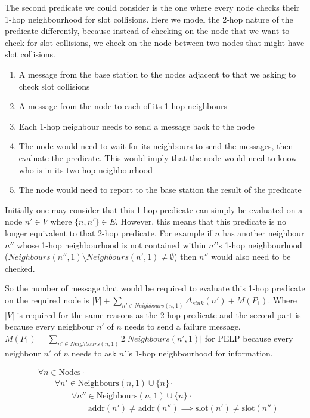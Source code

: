 The second predicate we could consider is the one where every node checks their 1-hop neighbourhood for slot collisions. Here we model the 2-hop nature of the predicate differently, because instead of checking on the node that we want to check for slot collisions, we check on the node between two nodes that might have slot collisions.

\begin{enumerate}
	\item A message from the base station to the nodes adjacent to that we asking to check slot collisions
	\item A message from the node to each of its 1-hop neighbours
	\item Each 1-hop neighbour needs to send a message back to the node
	\item The node would need to wait for its neighbours to send the messages, then evaluate the predicate. This would imply that the node would need to know who is in its two hop neighbourhood
	\item The node would need to report to the base station the result of the predicate
\end{enumerate}

Initially one may consider that this 1-hop predicate can simply be evaluated on a node $n' \in V$ where $\{n, n'\} \in E$. However, this means that this predicate is no longer equivalent to that 2-hop predicate. For example if $n$ has another neighbour $n''$ whose 1-hop neighbourhood is not contained within $n'$'s 1-hop neighbourhood ($Neighbours(n'', 1) \setminus Neighbours(n', 1) \not= \emptyset$) then $n''$ would also need to be checked.

So the number of message that would be required to evaluate this 1-hop predicate on the required node is  $|V| + \sum_{n' \in Neighbours(n, 1)}{\Delta_{sink}(n')} + M(P_{1})$. Where $|V|$ is required for the same reasons as the 2-hop predicate and the second part is because every neighbour $n'$ of $n$ needs to send a failure message. $M(P_{1}) = \sum_{n' \in Neighbours(n, 1)}{2|Neighbours(n', 1)|}$ for PELP because every neighbour $n'$ of $n$ needs to ask $n'$'s 1-hop neighbourhood for information.


\begin{align}
\label{eq:1-hop-slot-pred}
&				\forall n \in \text{Nodes} \cdot \\
& \hspace{2em}		\forall n' \in \text{Neighbours}(n, 1) \cup \{n\} \cdot \\
& \hspace{4em}			\forall n'' \in \text{Neighbours}(n, 1) \cup \{n\} \cdot \\
& \hspace{6em}				\text{addr}(n') \not= \text{addr}(n'') \implies \text{slot}(n') \neq \text{slot}(n'')
\end{align}

